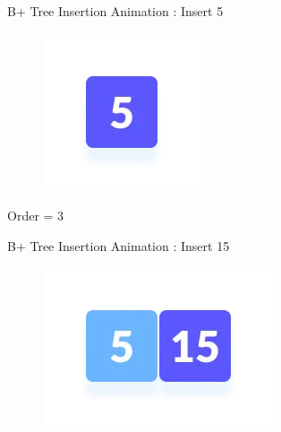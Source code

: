 \documentclass{beamer}
\begin{document}
\begin{frame}{B+ Tree Insertion Animation : \alert{Insert 5}}
    \begin{table}[h]
        \centering
        \begin{figure}
       
            \centering
            \includegraphics[scale=0.8]{Images/bi1.jpg}
        \end{figure}
         \alert{Order = 3}
    \end{table} 
\end{frame}
\begin{frame}{B+ Tree Insertion Animation : \alert{Insert 15}}
    \begin{table}[h]
        \centering
        \begin{figure}
       
            \centering
            \includegraphics[scale=0.8]{Images/bi2.jpg}
        \end{figure}
    \end{table} 
\end{frame}
\end{document}
